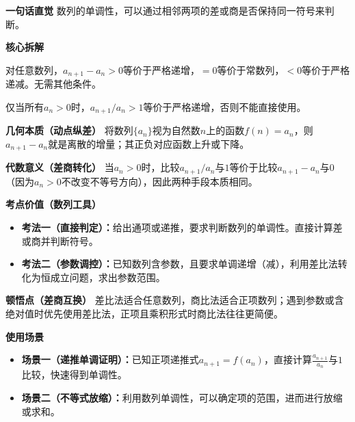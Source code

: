 \begin{explanationbox}
	\textbf{\textcolor{CExplanation}{一句话直觉}}
	数列的单调性，可以通过相邻两项的差或商是否保持同一符号来判断。

	\medskip
	\textbf{\textcolor{CExplanation}{核心拆解}}
	\begin{description}[style=nextline, leftmargin=2.8em, labelsep=0.5em, itemsep=0.45em]
		\item[\textbf{要点一（差比法通用）：}]
			对任意数列，$a_{n+1}-a_n>0$等价于严格递增，$=0$等价于常数列，$<0$等价于严格递减。无需其他条件。
		\item[\textbf{要点二（商比法条件）：}]
			仅当所有$a_n>0$时，$a_{n+1}/a_n>1$等价于严格递增，否则不能直接使用。
	\end{description}

	\medskip
	\textbf{\textcolor{CExplanation}{几何本质（动点纵差）}}
	将数列$\{a_n\}$视为自然数$n$上的函数$f(n)=a_n$，则$a_{n+1}-a_n$就是离散的增量；其正负对应函数上升或下降。

	\medskip
	\textbf{\textcolor{CExplanation}{代数意义（差商转化）}}
	当$a_n>0$时，比较$a_{n+1}/a_n$与$1$等价于比较$a_{n+1}-a_n$与$0$（因为$a_n>0$不改变不等号方向），因此两种手段本质相同。

	\medskip
	\textbf{\textcolor{CExplanation}{考点价值（数列工具）}}
	\begin{itemize}[leftmargin=*, itemsep=0.5em, topsep=0.4em]
		\item\textbf{考法一（直接判定）：}给出通项或递推，要求判断数列的单调性。直接计算差或商并判断符号。\item\textbf{考法二（参数调控）：}已知数列含参数，且要求单调递增（减），利用差比法转化为恒成立问题，求出参数范围。
	\end{itemize}

	\medskip
	\textbf{\textcolor{CExplanation}{顿悟点（差商互换）}}
	差比法适合任意数列，商比法适合正项数列；遇到参数或含绝对值时优先使用差比法，正项且乘积形式时商比法往往更简便。

	\medskip
	\textbf{\textcolor{CExplanation}{使用场景}}
	\begin{itemize}[leftmargin=*, itemsep=0.5em, topsep=0.4em]
		\item\textbf{场景一（递推单调证明）：}已知正项递推式$a_{n+1}=f(a_n)$，直接计算$\frac{a_{n+1}}{a_n}$与$1$比较，快速得到单调性。\item\textbf{场景二（不等式放缩）：}利用数列单调性，可以确定项的范围，进而进行放缩或求和。
	\end{itemize}

\end{explanationbox}
